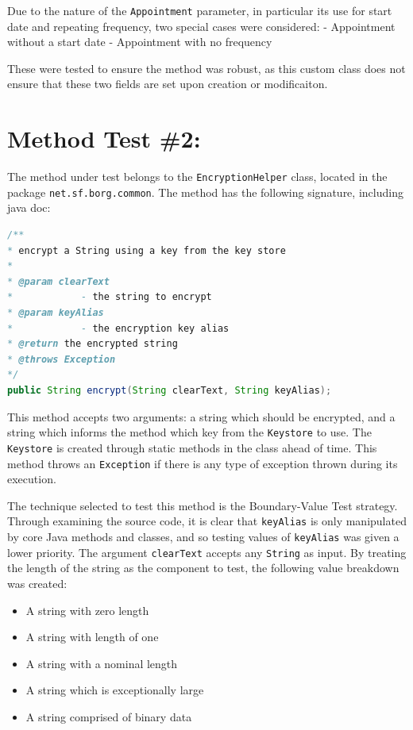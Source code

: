 Due to the nature of the \lstinline!Appointment! parameter, in
particular its use for start date and repeating frequency, two special
cases were considered: - Appointment without a start date - Appointment
with no frequency

These were tested to ensure the method was robust, as this custom class
does not ensure that these two fields are set upon creation or
modificaiton.

\section{Method Test \#2:}\label{method-test-2}

The method under test belongs to the \lstinline!EncryptionHelper! class,
located in the package \lstinline!net.sf.borg.common!. The method has
the following signature, including java doc:

\begin{lstlisting}[language=Java]
/**
* encrypt a String using a key from the key store
*
* @param clearText
*            - the string to encrypt
* @param keyAlias
*            - the encryption key alias
* @return the encrypted string
* @throws Exception
*/
public String encrypt(String clearText, String keyAlias);
\end{lstlisting}

This method accepts two arguments: a string which should be encrypted,
and a string which informs the method which key from the
\lstinline!Keystore! to use. The \lstinline!Keystore! is created through
static methods in the class ahead of time. This method throws an
\lstinline!Exception! if there is any type of exception thrown during
its execution.

The technique selected to test this method is the Boundary-Value Test
strategy. Through examining the source code, it is clear that
\lstinline!keyAlias! is only manipulated by core Java methods and
classes, and so testing values of \lstinline!keyAlias! was given a lower
priority. The argument \lstinline!clearText! accepts any
\lstinline!String! as input. By treating the length of the string as the
component to test, the following value breakdown was created:

\begin{itemize}
\tightlist
\item
  A string with zero length
\item
  A string with length of one
\item
  A string with a nominal length
\item
  A string which is exceptionally large
\item
  A string comprised of binary data
\end{itemize}

